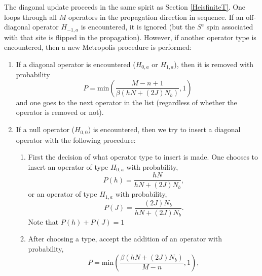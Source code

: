 \documentclass[vecphys]{svmult}
\begin{document}
The diagonal update proceeds in the same spirit as Section \ref{HeisfiniteT}.  One loops through all $M$ operators in the propagation direction in sequence. If an off-diagonal operator $H_{-1,a}$ is encountered, it is ignored (but the $S^z$ spin associated with that site is flipped in the propagation).  However, if another operator type is encountered, then a new Metropolis procedure is performed:
\begin{enumerate}
\item If a diagonal operator is encountered ($H_{0,a}$ or $H_{1,a}$), then it is removed with probability
\begin{equation}
P = \mathrm{min}\left( \frac{M-n+1}{\beta(hN + (2J)N_b)},1\right)
\end{equation}
and one goes to the next operator in the list (regardless of whether the operator is removed or not).
\item If a null operator ($H_{0,0}$) is encountered, then we try to insert a diagonal operator with the following procedure:
\begin{enumerate}
\item First the decision of what operator type to insert is made.  One chooses to insert an operator of type $H_{0,a}$ with probability,
\begin{equation}
P(h) = \frac{h N}{hN + (2J)N_b},
\end{equation}
or an operator of type $H_{1,a}$ with probability,
\begin{equation}
P(J) = \frac{(2J)N_b}{hN + (2J)N_b} .
\end{equation}
Note that $P(h) + P(J) = 1$
\item After choosing a type, accept the addition of an operator with probability,
\begin{equation}
P = \mathrm{min}\left(\frac{\beta(hN + (2J)N_b)}{M-n},1\right),
\end{equation}

\end{enumerate}
\end{enumerate}
\end{document}
